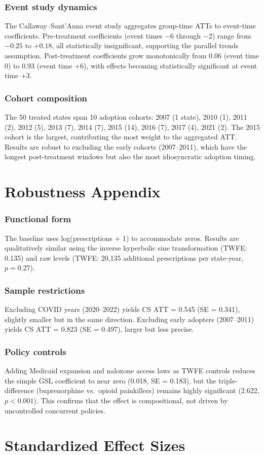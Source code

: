 \documentclass[12pt]{article}
\begin{document}
\subsubsection*{Event study dynamics} The Callaway--Sant'Anna event study aggregates group-time ATTs to event-time coefficients. Pre-treatment coefficients (event times $-6$ through $-2$) range from $-0.25$ to $+0.18$, all statistically insignificant, supporting the parallel trends assumption. Post-treatment coefficients grow monotonically from 0.06 (event time 0) to 0.93 (event time +6), with effects becoming statistically significant at event time +3.

\subsubsection*{Cohort composition} The 50 treated states span 10 adoption cohorts: 2007 (1 state), 2010 (1), 2011 (2), 2012 (5), 2013 (7), 2014 (7), 2015 (14), 2016 (7), 2017 (4), 2021 (2). The 2015 cohort is the largest, contributing the most weight to the aggregated ATT. Results are robust to excluding the early cohorts (2007--2011), which have the longest post-treatment windows but also the most idiosyncratic adoption timing.

\section{Robustness Appendix}

\subsubsection*{Functional form} The baseline uses log(prescriptions + 1) to accommodate zeros. Results are qualitatively similar using the inverse hyperbolic sine transformation (TWFE: 0.135) and raw levels (TWFE: 20,135 additional prescriptions per state-year, $p = 0.27$).

\subsubsection*{Sample restrictions} Excluding COVID years (2020--2022) yields CS ATT = 0.545 (SE = 0.341), slightly smaller but in the same direction. Excluding early adopters (2007--2011) yields CS ATT = 0.823 (SE = 0.497), larger but less precise.

\subsubsection*{Policy controls} Adding Medicaid expansion and naloxone access laws as TWFE controls reduces the simple GSL coefficient to near zero (0.018, SE = 0.183), but the triple-difference (buprenorphine vs.\ opioid painkillers) remains highly significant (2.622, $p < 0.001$). This confirms that the effect is compositional, not driven by uncontrolled concurrent policies.

\section{Standardized Effect Sizes}
\label{sec:sde}


\end{document}
